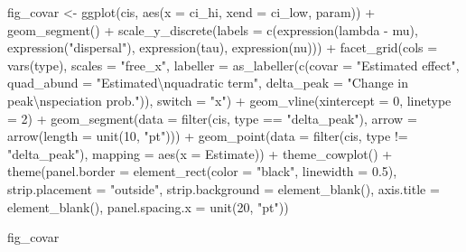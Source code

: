 \documentclass[
  letterpaper,
  DIV=11,
  numbers=noendperiod]{scrartcl}
\newenvironment{Shaded}{\begin{snugshade}}{\end{snugshade}}
\newcommand{\AttributeTok}[1]{\textcolor[rgb]{0.40,0.45,0.13}{#1}}
\newcommand{\DecValTok}[1]{\textcolor[rgb]{0.68,0.00,0.00}{#1}}
\newcommand{\FloatTok}[1]{\textcolor[rgb]{0.68,0.00,0.00}{#1}}
\newcommand{\FunctionTok}[1]{\textcolor[rgb]{0.28,0.35,0.67}{#1}}
\newcommand{\NormalTok}[1]{\textcolor[rgb]{0.00,0.23,0.31}{#1}}
\newcommand{\OtherTok}[1]{\textcolor[rgb]{0.00,0.23,0.31}{#1}}
\newcommand{\SpecialCharTok}[1]{\textcolor[rgb]{0.37,0.37,0.37}{#1}}
\newcommand{\StringTok}[1]{\textcolor[rgb]{0.13,0.47,0.30}{#1}}
\begin{document}
\begin{Shaded}
\begin{Highlighting}[]
\NormalTok{fig\_covar }\OtherTok{\textless{}{-}} \FunctionTok{ggplot}\NormalTok{(cis, }\FunctionTok{aes}\NormalTok{(}\AttributeTok{x =}\NormalTok{ ci\_hi, }\AttributeTok{xend =}\NormalTok{ ci\_low, param)) }\SpecialCharTok{+}
    \FunctionTok{geom\_segment}\NormalTok{() }\SpecialCharTok{+}
    \FunctionTok{scale\_y\_discrete}\NormalTok{(}\AttributeTok{labels =} \FunctionTok{c}\NormalTok{(}\FunctionTok{expression}\NormalTok{(lambda }\SpecialCharTok{{-}}\NormalTok{ mu), }
                                 \FunctionTok{expression}\NormalTok{(}\StringTok{"dispersal"}\NormalTok{), }
                                 \FunctionTok{expression}\NormalTok{(tau), }
                                 \FunctionTok{expression}\NormalTok{(nu))) }\SpecialCharTok{+}
    \FunctionTok{facet\_grid}\NormalTok{(}\AttributeTok{cols =} \FunctionTok{vars}\NormalTok{(type), }\AttributeTok{scales =} \StringTok{"free\_x"}\NormalTok{, }
               \AttributeTok{labeller =} \FunctionTok{as\_labeller}\NormalTok{(}\FunctionTok{c}\NormalTok{(}\AttributeTok{covar =} \StringTok{"Estimated effect"}\NormalTok{, }
                                        \AttributeTok{quad\_abund =} \StringTok{"Estimated}\SpecialCharTok{\textbackslash{}n}\StringTok{quadratic term"}\NormalTok{, }
                                        \AttributeTok{delta\_peak =} \StringTok{"Change in peak}\SpecialCharTok{\textbackslash{}n}\StringTok{speciation prob."}\NormalTok{)), }
               \AttributeTok{switch =} \StringTok{"x"}\NormalTok{) }\SpecialCharTok{+}
    \FunctionTok{geom\_vline}\NormalTok{(}\AttributeTok{xintercept =} \DecValTok{0}\NormalTok{, }\AttributeTok{linetype =} \DecValTok{2}\NormalTok{) }\SpecialCharTok{+}
    \FunctionTok{geom\_segment}\NormalTok{(}\AttributeTok{data =} \FunctionTok{filter}\NormalTok{(cis, type }\SpecialCharTok{==} \StringTok{"delta\_peak"}\NormalTok{), }
                 \AttributeTok{arrow =} \FunctionTok{arrow}\NormalTok{(}\AttributeTok{length =} \FunctionTok{unit}\NormalTok{(}\DecValTok{10}\NormalTok{, }\StringTok{"pt"}\NormalTok{))) }\SpecialCharTok{+}
    \FunctionTok{geom\_point}\NormalTok{(}\AttributeTok{data =} \FunctionTok{filter}\NormalTok{(cis, type }\SpecialCharTok{!=} \StringTok{"delta\_peak"}\NormalTok{), }
               \AttributeTok{mapping =} \FunctionTok{aes}\NormalTok{(}\AttributeTok{x =}\NormalTok{ Estimate)) }\SpecialCharTok{+}
    \FunctionTok{theme\_cowplot}\NormalTok{() }\SpecialCharTok{+}
    \FunctionTok{theme}\NormalTok{(}\AttributeTok{panel.border =} \FunctionTok{element\_rect}\NormalTok{(}\AttributeTok{color =} \StringTok{"black"}\NormalTok{, }\AttributeTok{linewidth =} \FloatTok{0.5}\NormalTok{), }
          \AttributeTok{strip.placement =} \StringTok{"outside"}\NormalTok{, }
          \AttributeTok{strip.background =} \FunctionTok{element\_blank}\NormalTok{(), }
          \AttributeTok{axis.title =} \FunctionTok{element\_blank}\NormalTok{(), }
          \AttributeTok{panel.spacing.x =} \FunctionTok{unit}\NormalTok{(}\DecValTok{20}\NormalTok{, }\StringTok{"pt"}\NormalTok{))}

\NormalTok{fig\_covar }
\end{Highlighting}
\end{Shaded}
\end{document}
